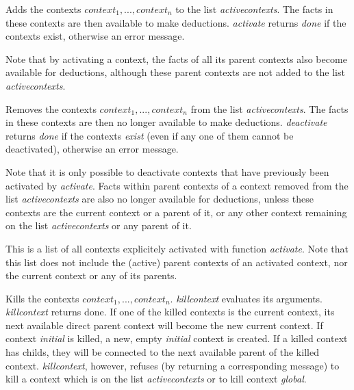 \documentclass[../Maxima_Workbook.tex]{subfiles}
\begin{document}
\lzz \hypertarget{activate}{} \hfill \tcr{[function]}

\lz Adds the contexts $context_1, . . . , context_n$ to the list \emph{activecontexts}. The facts in these contexts are then available to make deductions. \emph{activate} returns \emph{done} if the contexts exist, otherwise an error message.

Note that by activating a context, the facts of all its parent contexts also become available for deductions, although these parent contexts are not added to the list \emph{activecontexts}.

\lzz \hypertarget{deactivate}{} \hfill \tcr{[function]}

\lz Removes the contexts $context_1, . . . , context_n$ from the list \emph{activecontexts}. The facts in these contexts are then no longer available to make deductions. \emph{deactivate} returns \emph{done} if the contexts \emph{exist} (even if any one of them cannot be deactivated), otherwise an error message.

\lz Note that it is only possible to deactivate contexts that have previously been activated by \emph{activate}. Facts within parent contexts of a context removed from the list \emph{activecontexts} are also no longer available for deductions, unless these contexts are the current context or a parent of it, or any other context remaining on the list \emph{activecontexts} or any parent of it.

\lzz \hypertarget{activecontexts}{} \hfill {}

\lz This is a list of all contexts explicitely activated with function \emph{activate}. Note that this list does not include the (active) parent contexts of an activated context, nor the current context or any of its parents.

\lzz \hypertarget{killcontext}{} \hfill \tcr{[function]}

\lz Kills the contexts $context_1, . . . , context_n$. \emph{killcontext} evaluates its arguments. \emph{killcontext} returns done. If one of the killed contexts is the current context, its next available direct parent context will become the new current context. If context \emph{initial} is killed, a new, empty \emph{initial} context is created. If a killed context has childs, they will be connected to the next available parent of the killed context. \emph{killcontext}, however, refuses (by returning a corresponding message) to kill a context which is on the list \emph{activecontexts} or to kill context \emph{global}.
\end{document}
